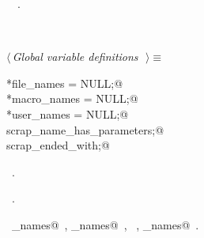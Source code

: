 \documentclass{report}
\begin{document}
\begin{flushleft}
\begin{minipage}{\linewidth}
\vspace{-2ex}
\footnotesize\addtolength{\baselineskip}{-1ex}
\begin{list}{}{\setlength{\itemsep}{-\parsep}\setlength{\itemindent}{-\leftmargin}}
\item \NWtxtIdentsUsed\nobreak\  \verb@Name@\nobreak\ .\end{list}
\end{minipage}\\[4ex]
\end{flushleft}
\begin{flushleft} \small
\begin{minipage}{\linewidth} \label{scrap193}
$\langle\,${\it Global variable definitions}\nobreak\ {\footnotesize {}}$\,\rangle\equiv$
\vspace{-1ex}
\begin{list}{}{} \item
\mbox{}\verb@Name *file_names = NULL;@\\
\mbox{}\verb@Name *macro_names = NULL;@\\
\mbox{}\verb@Name *user_names = NULL;@\\
\mbox{}\verb@int scrap_name_has_parameters;@\\
\mbox{}\verb@int scrap_ended_with;@\\
\mbox{}\verb@@{\NWsep}
\end{list}
\vspace{-1ex}
\footnotesize\addtolength{\baselineskip}{-1ex}
\begin{list}{}{\setlength{\itemsep}{-\parsep}\setlength{\itemindent}{-\leftmargin}}
\item \NWtxtMacroDefBy\ .
\item \NWtxtMacroRefIn\ .
\end{list}
\vspace{-2ex}
\footnotesize\addtolength{\baselineskip}{-1ex}
\begin{list}{}{\setlength{\itemsep}{-\parsep}\setlength{\itemindent}{-\leftmargin}}
\item \NWtxtIdentsUsed\nobreak\  \verb@file_names@\nobreak\ , \verb@macro_names@\nobreak\ , \verb@Name@\nobreak\ , \verb@user_names@\nobreak\ .\end{list}
\end{minipage}\\[4ex]
\end{flushleft}
\end{document}
